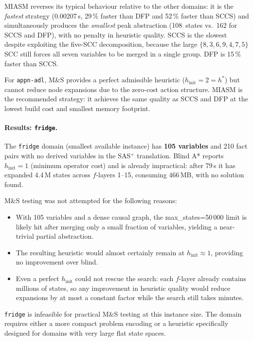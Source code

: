\documentclass[11pt,a4paper]{article}
\begin{document}
MIASM reverses its typical behaviour relative to the other domains: it is the
\emph{fastest} strategy (0.00207\,s, 29\,\% faster than DFP and 52\,\% faster
than SCCS) and simultaneously produces the \emph{smallest} peak abstraction
(108~states vs.\ 162 for SCCS and DFP), with no penalty in heuristic quality.
SCCS is the slowest despite exploiting the five-SCC decomposition, because the
large $\{8,3,6,9,4,7,5\}$ SCC still forces all seven variables to be merged
in a single group.
DFP is 15\,\% faster than SCCS.

For \texttt{appn-adl}, M\&S provides a perfect admissible heuristic
($h_{\mathrm{init}} = 2 = h^*$) but cannot reduce node expansions due to the
zero-cost action structure.
MIASM is the recommended strategy: it achieves the same quality as SCCS and
DFP at the lowest build cost and smallest memory footprint.

\paragraph{Results: \texttt{fridge}.}

The \texttt{fridge} domain (smallest available instance) has \textbf{105
variables} and 210 fact pairs with no derived variables in the SAS$^+$
translation.
Blind A* reports $h_{\mathrm{init}} = 1$ (minimum operator cost) and is
already impractical: after 79\,s it has expanded 4.4\,M states across
$f$-layers 1--15, consuming 466\,MB, with no solution found.

M\&S testing was not attempted for the following reasons:
\begin{itemize}
  \item With 105 variables and a dense causal graph, the max\_states=50\,000
    limit is likely hit after merging only a small fraction of variables,
    yielding a near-trivial partial abstraction.
  \item The resulting heuristic would almost certainly remain at
    $h_{\mathrm{init}} \approx 1$, providing no improvement over blind.
  \item Even a perfect $h_{\mathrm{init}}$ could not rescue the search: each
    $f$-layer already contains millions of states, so any improvement in
    heuristic quality would reduce expansions by at most a constant factor
    while the search still takes minutes.
\end{itemize}

\texttt{fridge} is infeasible for practical M\&S testing at this instance
size.  The domain requires either a more compact problem encoding or a
heuristic specifically designed for domains with very large flat state spaces.
\end{document}
